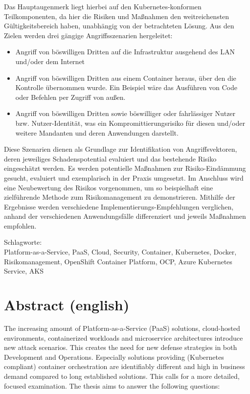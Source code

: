 Das Hauptaugenmerk liegt hierbei auf den Kubernetes-konformen Teilkomponenten, da hier die Risiken und Maßnahmen den weitreichensten Gültigkeitsbereich haben, unabhängig von der betrachteten Lösung.
Aus den Zielen werden drei gängige Angriffsszenarien hergeleitet: 

\begin{itemize}

\item Angriff von böswilligen Dritten auf die Infrastruktur ausgehend des LAN und/oder dem Internet

\item Angriff von böswilligen Dritten aus einem Container heraus, über den die Kontrolle übernommen wurde. Ein Beispiel wäre das Ausführen von Code oder Befehlen per Zugriff von außen.

\item Angriff von böswilligen Dritten sowie böswilliger oder fahrlässiger Nutzer bzw. Nutzer-Identität, was ein Kompromittierungsrisiko für diesen und/oder weitere Mandanten und deren Anwendungen darstellt.

\end{itemize}

Diese Szenarien dienen als Grundlage zur Identifikation von Angriffsvektoren, deren jeweiliges Schadenspotential evaluiert und das bestehende Risiko eingeschätzt werden.
Es werden potentielle Maßnahmen zur Risiko-Eindämmung gesucht, evaluiert und exemplarisch in der Praxis umgesetzt.
Im Anschluss wird eine Neubewertung des Risikos vorgenommen, um so beispielhaft eine zielführende Methode zum Risikomanagement zu demonstrieren.
Mithilfe der Ergebnisse werden verschiedene Implementierungs-Empfehlungen verglichen, anhand der verschiedenen Anwendungsfälle differenziert und jeweils Maßnahmen empfohlen.

\bigskip

\noindent
Schlagworte: \\
Platform-as-a-Service, PaaS, Cloud, Security, Container, Kubernetes, Docker, Risikomanagement, OpenShift Container Platform, OCP, Azure Kubernetes Service, AKS

\chapter*{Abstract (english)}
\thispagestyle{empty}

The increasing amount of Platform-as-a-Service (PaaS) solutions, cloud-hosted environments, containerized workloads and microservice architectures introduce new attack scenarios. 
This creates the need for new defense strategies in both Development and Operations. 
Especially solutions providing (Kubernetes compliant) container orchestration are identifiably different and high in business demand compared to long established solutions. 
This calls for a more detailed, focused examination. 
The thesis aims to answer the following questions:


